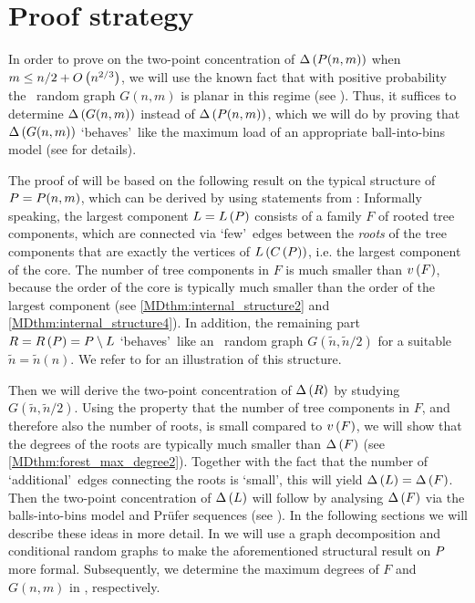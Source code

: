 \section{Proof strategy}\label{MDsec:strategy}
In order to prove  on the two-point concentration of $\Delta\left(P(n,m)\right)$ when $m\leq n/2+O\left(n^{2/3}\right)$, we will use the known fact that with positive probability the \ER\ random graph $G(n,m)$ is planar in this regime (see ). Thus, it suffices to determine $\Delta\left(G(n,m)\right)$ instead of $\Delta\left(P(n,m)\right)$, which we will do by proving that $\Delta\left(G(n,m)\right)$ \lq behaves\rq\ like the maximum load of an appropriate ball-into-bins model (see  for details).

The proof of  will be based on the following result on the typical structure of $P=P(n,m)$, which can be derived by using statements from \cite{KangLuczak2012,KangMosshammerSpruessel2020}: Informally speaking, the largest component $L=L\left(P\right)$ consists of a family $F$ of rooted tree components, which are connected via \lq few\rq\ edges between the {\em roots} of the tree components that are exactly the vertices of $L\left(C\left(P\right)\right)$, i.e. the largest component of the core. The number of tree components in $F$ is much smaller than $v\left({F}\right)$, because the order of the core is typically much smaller than the order of the largest component (see \ref{MDthm:internal_structure2} and \ref{MDthm:internal_structure4}). In addition, the remaining part $R=R\left(P\right)=P\setminus L$ \lq behaves\rq\ like an \ER\ random graph $G(\tilde{n}, \tilde{n}/2)$ for a suitable $\tilde{n}=\tilde{n}(n)$. We refer to  for an illustration of this structure. 

Then we will derive the two-point concentration of $\Delta\left(R\right)$ by studying $G(\tilde{n}, \tilde{n}/2)$. Using the property that the number of tree components in $F$, and therefore also the number of roots, is small compared to $v\left({F}\right)$, we will show that the degrees of the roots are typically much smaller than $\Delta\left(F\right)$ (see \ref{MDthm:forest_max_degree2}). Together with the fact that the number of \lq additional\rq\ edges connecting the roots is \lq small\rq, this will yield $\Delta\left(L\right)=\Delta\left(F\right)$. Then the two-point concentration of $\Delta\left(L\right)$ will follow by analysing $\Delta\left(F\right)$ via the balls-into-bins model and Prüfer sequences (see ). In the following sections we will describe these ideas in more detail. In  we will use a graph decomposition and conditional random graphs to make the aforementioned structural result on $P$ more formal. Subsequently, we determine the maximum degrees of $F$ and $G(n,m)$ in , respectively. 

